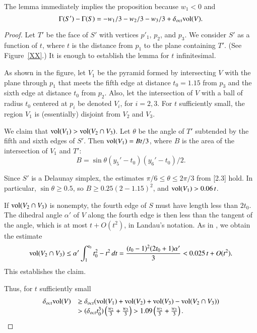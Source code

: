The lemma immediately implies the proposition because $w_1<0$ and
$$\Gamma(S') -\Gamma(S) = -w_1/3 -w_2/3 -w_3/3 + \delta_{oct}{\operatorname{vol}}(V).$$


\begin{proof} Let $T'$ be the face of $S'$ with vertices $p'_1$,
$p_2$, and $p_3$. We consider $S'$ as a function of $t$, where $t$
is the distance from $p_1$ to the plane containing $T'$. (See
Figure~\ref{XX}.) It is enough to establish the lemma for $t$
infinitesimal.

As shown in the figure,  let $V_1$ be the pyramid formed by
intersecting $V$ with the plane through $p_1$ that meets the fifth
edge at distance $t_0=1.15$ from $p_3$ and the sixth edge at
distance $t_0$ from $p_2$. Also, let the intersection of $V$ with
a ball of radius $t_0$ centered at $p_i$ be denoted $V_i$, for
$i=2,3$.  For $t$ sufficiently small, the region $V_1$ is
(essentially) disjoint from $V_2$ and $V_3$.

We claim that ${\operatorname{vol}}(V_1) > {\operatorname{vol}}(V_2\cap V_3)$.
 Let $\theta$ be the angle of $T'$
subtended by the fifth and sixth edges of $S'$.  Then
${\operatorname{vol}}(V_1) = B t/3$, where $B$ is the area of the intersection
of $V_1$ and $T'$:
    \begin{equation}
    \label{eqn:874}
    B = \sin\theta (y_5'-t_0)(y_6'-t_0)/2.  %
    \end{equation}

Since $S'$ is a Delaunay simplex, the estimates
$\pi/6\le\theta\le2\pi/3$ from \cite{remarks}[2.3] hold.  In particular,
$\sin\theta\ge 0.5$, so $B\ge 0.25(2-1.15)^2$, and ${\operatorname{vol}}(V_1)>
0.06\,t$.

If ${\operatorname{vol}}(V_2\cap V_3)$ is nonempty, the fourth edge of $S$
must have length less than $2t_0$.  The dihedral angle $\alpha'$
of $V$ along the fourth edge is then less than the tangent of the
angle, which is at most $t+ {O}(t^2)$, in Landau's notation. As in
\cite{remarks}, we obtain the estimate
$${\operatorname{vol}}(V_2\cap V_3) \le {\alpha'} \int_1^{t_0}
        t_0^2-t^2\,dt = \frac{ (t_0-1)^2(2t_0+1)\alpha'}{3}
        < 0.025\, t + {O}(t^2).$$
This establishes the claim.

Thus, for $t$ sufficiently small
   $$
   \begin{array}{lll}
   \delta_{oct}{\operatorname{vol}}(V) &\ge \delta_{oct}({\operatorname{vol}}(V_1) +{\operatorname{vol}}(V_2)
        +{\operatorname{vol}}(V_3) - {\operatorname{vol}}(V_2\cap V_3)) \\
        &>
        (\delta_{oct} t_0^3) \left( \frac{w_2}{3} + \frac{w_3}{3}\right)
        > 1.09 \left( \frac{w_2}{3} + \frac{w_3}{3}\right).
    \end{array}
    $$
\end{proof}


